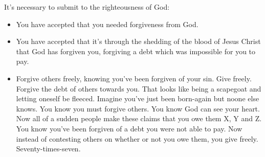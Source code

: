 \documentclass[11pt]{article}
\begin{document}
It's necessary to submit to the righteousness of God:
\begin{itemize}
\item You have accepted that you needed forgiveness from God.
\item You have accepted that it's through the shedding of the blood of Jesus Christ that God has forgiven you, forgiving a debt which was impossible for you to pay.
\item Forgive others freely, knowing you've been forgiven of your sin. Give freely. Forgive the debt of others towards you. That looks like being a scapegoat and letting oneself be fleeced. Imagine you've just been born-again but noone else knows. You know you must forgive others. You know God can see your heart. Now all of a sudden people make these claims that you owe them X, Y and Z. You know you've been forgiven of a debt you were not able to pay. Now instead of contesting others on whether or not you owe them, you give freely. Seventy-times-seven.
\end{itemize}
\end{document}
